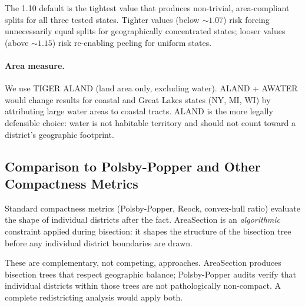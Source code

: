 The 1.10 default is the tightest value that produces non-trivial, area-compliant
splits for all three tested states.
Tighter values (below $\sim 1.07$) risk forcing unnecessarily equal splits for
geographically concentrated states; looser values (above $\sim 1.15$) risk
re-enabling peeling for uniform states.

\paragraph{Area measure.}
We use TIGER ALAND (land area only, excluding water).
ALAND + AWATER would change results for coastal and Great Lakes states
(NY, MI, WI) by attributing large water areas to coastal tracts.
ALAND is the more legally defensible choice: water is not habitable territory
and should not count toward a district's geographic footprint.

\subsection{Comparison to Polsby-Popper and Other Compactness Metrics}

Standard compactness metrics (Polsby-Popper, Reock, convex-hull ratio) evaluate
the shape of individual districts after the fact.
AreaSection is an \emph{algorithmic} constraint applied during bisection:
it shapes the structure of the bisection tree before any individual district
boundaries are drawn.

These are complementary, not competing, approaches.
AreaSection produces bisection trees that respect geographic balance;
Polsby-Popper audits verify that individual districts within those trees
are not pathologically non-compact.
A complete redistricting analysis would apply both.
